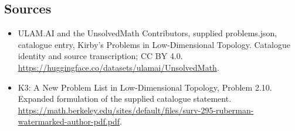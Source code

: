 \documentclass[11pt,a4paper]{article}
\begin{document}
\subsection{Sources}
\begin{itemize}
\item[S1] ULAM.AI and the UnsolvedMath Contributors, supplied problems.json, catalogue entry, Kirby's Problems in Low-Dimensional Topology. Catalogue identity and source transcription; CC BY 4.0.
\url{https://huggingface.co/datasets/ulamai/UnsolvedMath}.
\item[S2] K3: A New Problem List in Low-Dimensional Topology, Problem 2.10. Expanded formulation of the supplied catalogue statement.
\url{https://math.berkeley.edu/sites/default/files/surv-295-ruberman-watermarked-author-pdf.pdf}.
\end{itemize}
\end{document}
